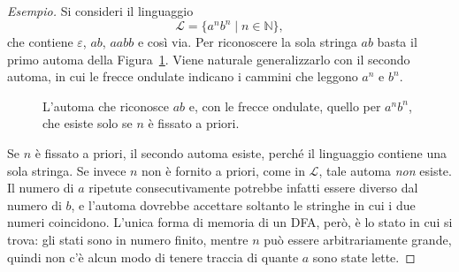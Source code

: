 \documentclass[a4paper, 11pt, oneside]{book}
\theoremstyle{formale}
\newenvironment{esempio}
    {\begin{proof}[\textit{Esempio}]\renewcommand{\qedsymbol}{$\diamond$}}
    {\end{proof}}
\begin{document}
    \begin{esempio}
        Si consideri il linguaggio
        \begin{equation*}
            \mathcal{L} = \{a^n b^n \mid n \in \mathbb{N}\},
        \end{equation*}
        che contiene $\varepsilon$, $ab$, $aabb$ e cos\`i via. Per riconoscere la sola
        stringa $ab$ basta il primo automa della Figura~\ref{fig:anbn}. Viene naturale
        generalizzarlo con il secondo automa, in cui le frecce ondulate indicano i cammini
        che leggono $a^n$ e $b^n$.

        \begin{figure}[H]
            \centering
            \caption{L'automa che riconosce $ab$ e, con le frecce ondulate, quello per
                $a^n b^n$, che esiste solo se $n$ \`e fissato a priori.}
            \label{fig:anbn}
        \end{figure}

        Se $n$ \`e fissato a priori, il secondo automa esiste, perch\'e il linguaggio
        contiene una sola stringa. Se invece $n$ non \`e fornito a priori, come in
        $\mathcal{L}$, tale automa \emph{non} esiste. Il numero di $a$ ripetute
        consecutivamente potrebbe infatti essere diverso dal numero di $b$, e l'automa
        dovrebbe accettare soltanto le stringhe in cui i due numeri coincidono. L'unica
        forma di memoria di un DFA, per\`o, \`e lo stato in cui si trova: gli stati sono in
        numero finito, mentre $n$ pu\`o essere arbitrariamente grande, quindi non c'\`e
        alcun modo di tenere traccia di quante $a$ sono state lette.


\end{esempio}
\end{document}
